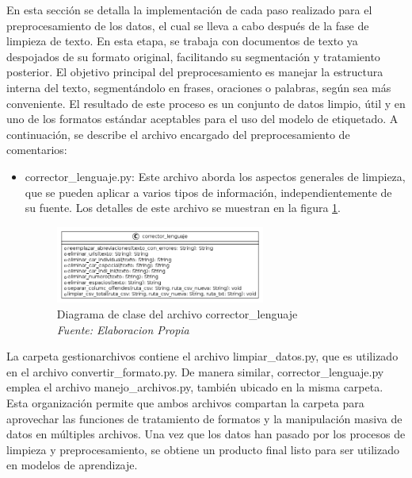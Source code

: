 En esta sección se detalla la implementación de cada paso realizado para el preprocesamiento de los datos, el cual se lleva a cabo después de la fase de limpieza de texto. En esta etapa, se trabaja con documentos de texto ya despojados de su formato original, facilitando su segmentación y tratamiento posterior. El objetivo principal del preprocesamiento es manejar la estructura interna del texto, segmentándolo en frases, oraciones o palabras, según sea más conveniente. El resultado de este proceso es un conjunto de datos limpio, útil y en uno de los formatos estándar aceptables para el uso del modelo de etiquetado. A continuación, se describe el archivo encargado del preprocesamiento de comentarios:

\begin{itemize}

\item corrector\_lenguaje.py: Este archivo aborda los aspectos generales de limpieza, que se pueden aplicar a varios tipos de información, independientemente de su fuente. Los detalles de este archivo se muestran en la figura \ref{fig:uml2}.

\begin{figure}[h!]
	\includegraphics[width=0.65\textwidth]{capitulo5/figuras/fig2.png}
	\caption{Diagrama de clase del archivo corrector\_lenguaje
		\\\textit{Fuente: Elaboracion Propia}}
	\label{fig:uml2}
\end{figure}

\end{itemize}

La carpeta gestionarchivos contiene el archivo limpiar\_datos.py, que es utilizado en el archivo convertir\_formato.py. De manera similar, corrector\_lenguaje.py emplea el archivo manejo\_archivos.py, también ubicado en la misma carpeta. Esta organización permite que ambos archivos compartan la carpeta para aprovechar las funciones de tratamiento de formatos y la manipulación masiva de datos en múltiples archivos.
Una vez que los datos han pasado por los procesos de limpieza y preprocesamiento, se obtiene un producto final listo para ser utilizado en modelos de aprendizaje.


